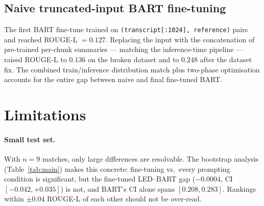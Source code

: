 \documentclass[10pt,a4paper]{article}
\begin{document}
\subsection{Naive truncated-input BART fine-tuning}
The first BART fine-tune trained on \texttt{(transcript[:1024], reference)} pairs and reached ROUGE-L $= 0.127$. Replacing the input with the concatenation of pre-trained per-chunk summaries --- matching the inference-time pipeline --- raised ROUGE-L to $0.136$ on the broken dataset and to $0.248$ after the dataset fix. The combined train/inference distribution match plus two-phase optimisation accounts for the entire gap between naive and final fine-tuned BART.

\section{Limitations}
\label{sec:limitations}

\paragraph{Small test set.} With $n = 9$ matches, only large differences are resolvable. The bootstrap analysis (Table~\ref{tab:main}) makes this concrete: fine-tuning vs.\ every prompting condition is significant, but the fine-tuned LED--BART gap ($-0.0004$, CI $[-0.042, +0.035]$) is not, and BART's CI alone spans $[0.208, 0.283]$. Rankings within $\pm 0.04$ ROUGE-L of each other should not be over-read.
\end{document}
